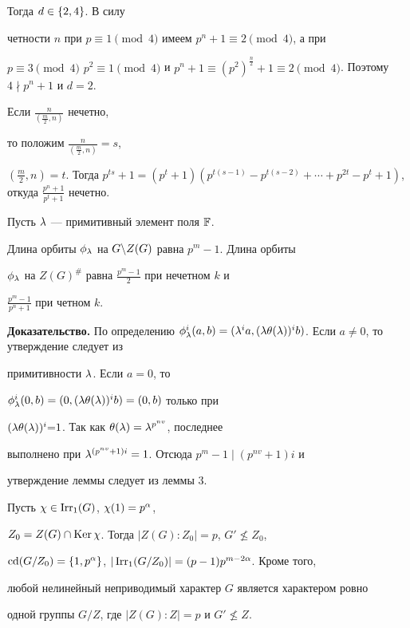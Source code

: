 Тогда $d\in\lbrace2,4\rbrace$. В силу


четности $n$ при $p\equiv1\pmod4$ имеем $p^n+1\equiv2\pmod4$, а при 


$p\equiv3\pmod4$ $p^2\equiv1\pmod4$ и $p^n+1\equiv(p^2)^{\frac n2}+1


\equiv2\pmod4$. Поэтому $4\nmid p^n+1$ и $d=2$.





Если $\frac{n}{(\frac m2,n)}$ нечетно, 


то положим $\frac{n}{(\frac m2,n)}=s$,


$(\frac m2,n)=t$. Тогда $p^{ts}+1=(p^t+1)(p^{t(s-1)}-p^{t(s-2)}+\dotsb+


p^{2t}-p^t+1)$, откуда $\frac{p^n+1}{p^t+1}$ нечетно. 








\begin{lem}


Пусть $\lambda$ --- примитивный элемент поля $\Bbb F$.


Длина орбиты $\phi_\lambda$ на $G\backslash Z(G)$ равна $p^m-1$. Длина орбиты


$\phi_\lambda$ на $Z(G)^{\#}$ равна $\frac{p^m-1}{2}$ при нечетном $k$ и 


$\frac{p^m-1}{p^n+1}$ при четном $k$.


\end{lem}








{\bf Доказательство.} По определению $\phi_\la^i(a,b)=


(\la^ia,(\la\te(\la))^ib)$. Если $a\ne0$, то утверждение следует из 


примитивности $\lambda$. Если $a=0$, то


$\phi_\lambda^i(0,b)=(0,(\lambda\theta(\lambda))^ib)=(0,b)$ только при


$(\lambda\theta(\lambda))^i{=}1$. Так как $\theta(\lambda)=\lambda^{p^{nv}}$, последнее


выполнено при $\lambda^{(p^{nv}+1)i}=1$. Отсюда $p^m-1\mid (p^{nv}+1)i$ и 


утверждение леммы следует из леммы 3.








\begin{lem}


Пусть $\chi\in\operatorname{Irr_1}(G)$, $\chi(1)=p^\alpha$,


$Z_0=Z(G)\cap\operatorname{Ker}\chi$. Тогда $|Z(G):Z_0|=p$, $G'\not\le Z_0$,


$\operatorname{cd}(G/Z_0)=\lbrace1,p^\alpha\rbrace$, $|\operatorname{Irr_1}(G/Z_0)|=(p-1)p^{m-2\alpha}$. Кроме того,


любой нелинейный неприводимый характер $G$ является характером ровно


одной группы $G/Z$, где $|Z(G):Z|=p$ и $G'\not\le Z$.


\end{lem}








